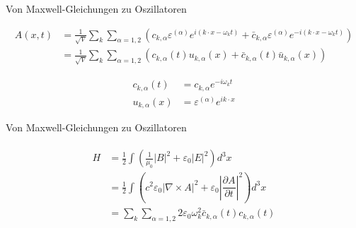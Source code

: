 \documentclass{beamer}
\begin{document}
\begin{frame}[t]{Von Maxwell-Gleichungen zu Oszillatoren}
	\vspace*{-0.5cm}
	\begin{center}
		\begin{minipage}{0.35\textwidth}
			\begin{align*}
			A(x,t) &= \frac{1}{\sqrt{V}} \sum_k \sum_{\alpha=1,2} \left(c_{k,\alpha} \varepsilon^{(\alpha)} e^{i (k \cdot x - \omega_k t)} + \bar{c}_{k,\alpha} \varepsilon^{(\alpha)} e^{-i(k \cdot x - \omega_k t)}\right)\\
			&= \frac{1}{\sqrt{V}} \sum_k \sum_{\alpha=1,2} \left(c_{k,\alpha}(t)u_{k,\alpha}(x) + \bar{c}_{k,\alpha}(t) \bar{u}_{k,\alpha}(x) \right)
			\end{align*}
		\end{minipage}
		\begin{minipage}{0.35\textwidth}
			\begin{align*}
			c_{k,\alpha}(t) &= c_{k,\alpha} e^{-i \omega_k t} \\
			u_{k,\alpha}(x) &= \varepsilon^{(\alpha)} e^{ik \cdot x}
			\end{align*}		
		\end{minipage}
	\end{center}
\end{frame}

\begin{frame}[t]{Von Maxwell-Gleichungen zu Oszillatoren}
	\vspace*{-0.5cm}
	
	\begin{center}
		\begin{minipage}{0.35\textwidth}
			\begin{align*}
			\begin{split}
			H &= \frac{1}{2} \int \left(\frac{1}{\mu_0}|B|^2 + \varepsilon_0|E|^2\right) d^3 x \\
			&= \frac{1}{2} \int \left(c^2 \varepsilon_0 | \nabla\times A |^2 + \varepsilon_0 \left| \dfrac{\partial A}{\partial t} \right|^2 \right) d^3 x \\
			& = \sum_k \sum_{\alpha=1,2} 2 \varepsilon_0 \omega_k^2 \bar{c}_{k,\alpha}(t) c_{k,\alpha}(t)
			\end{split}
			\end{align*}
		\end{minipage}
	\end{center}
\end{frame}
\end{document}
